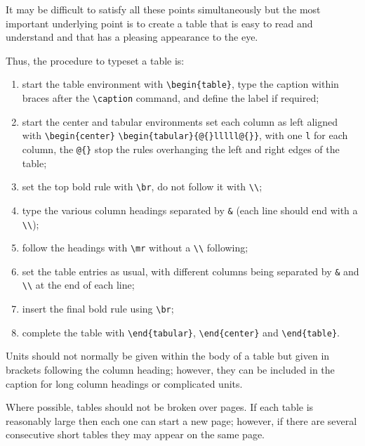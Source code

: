 It may be difficult to satisfy all these points simultaneously but the 
most important underlying point is to create a table that is easy to 
read and understand and that has a pleasing appearance to the eye.

Thus, the procedure to typeset a table is: 
\begin{enumerate}
\item start the table environment
with \verb"\begin{table}",
 type the caption within 
braces after the \verb"\caption" command, and define the label
if required;
\item start the center and tabular environments
set each column as left aligned with \verb"\begin{center}"
\verb"\begin{tabular}{@{}lllll@{}}", with one \verb"l" for each column,
the \verb"@{}" stop the rules overhanging the left and right
edges of the table;
\item set the top bold rule with \verb"\br", do not 
follow it with \verb"\\";
\item type 
the various column headings separated by \verb"&"
(each line should end with a \verb"\\"); 
\item 
follow the headings with \verb"\mr" without a \verb"\\" following;
\item set the table entries as 
usual, with different columns being separated by \verb"&" and \verb"\\" at the
end of each line;
\item insert the final bold rule using \verb"\br";
\item complete the table with \verb"\end{tabular}", \verb"\end{center}" and
\verb"\end{table}". 
\end{enumerate}


Units should not normally be given within the body of a table but 
given in brackets following the column heading; however, they can be 
included in the caption for long column headings or complicated units. 

Where possible, tables should not be broken over pages. If each table 
is reasonably large then each one can start a new page; however, if 
there are several consecutive short tables they may appear on the same 
page.

